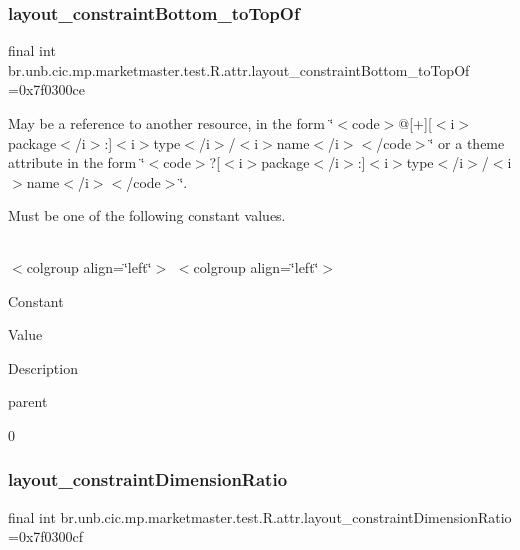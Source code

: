 \subsubsection{\texorpdfstring{layout\+\_\+constraint\+Bottom\+\_\+to\+Top\+Of}{layout\_constraintBottom\_toTopOf}}
{\footnotesize\ttfamily final int br.\+unb.\+cic.\+mp.\+marketmaster.\+test.\+R.\+attr.\+layout\+\_\+constraint\+Bottom\+\_\+to\+Top\+Of =0x7f0300ce\hspace{0.3cm}{\ttfamily [static]}}

May be a reference to another resource, in the form \char`\"{}$<$code$>$@\mbox{[}+\mbox{]}\mbox{[}$<$i$>$package$<$/i$>$\+:\mbox{]}$<$i$>$type$<$/i$>$/$<$i$>$name$<$/i$>$$<$/code$>$\char`\"{} or a theme attribute in the form \char`\"{}$<$code$>$?\mbox{[}$<$i$>$package$<$/i$>$\+:\mbox{]}$<$i$>$type$<$/i$>$/$<$i$>$name$<$/i$>$$<$/code$>$\char`\"{}. 

Must be one of the following constant values.

\tabulinesep=1mm
\begin{longtabu} spread 0pt [c]{*{0}{|X[-1]}|}
\hline
\end{longtabu}
$<$colgroup align=\char`\"{}left\char`\"{}$>$ $<$colgroup align=\char`\"{}left\char`\"{}$>$ 

Constant

Value

Description 

parent

0\mbox{\label{classbr_1_1unb_1_1cic_1_1mp_1_1marketmaster_1_1test_1_1R_1_1attr_ac4baefc6f703f8499d16f22e5bab13c9}} 
\subsubsection{\texorpdfstring{layout\+\_\+constraint\+Dimension\+Ratio}{layout\_constraintDimensionRatio}}
{\footnotesize\ttfamily final int br.\+unb.\+cic.\+mp.\+marketmaster.\+test.\+R.\+attr.\+layout\+\_\+constraint\+Dimension\+Ratio =0x7f0300cf\hspace{0.3cm}{\ttfamily [static]}}

